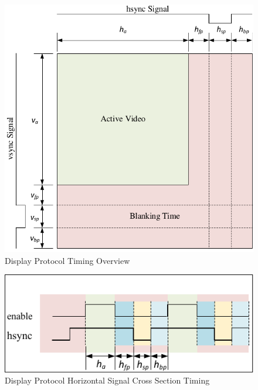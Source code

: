     \begin{figure}
        \centering
        \includegraphics[width=1.0\textwidth]{fig/display_timing_overview.pdf}
        \caption{Display Protocol Timing Overview}
        \label{fig:display_protocol_timing_overview}
    \end{figure}

    \begin{figure}
        \centering
        \includegraphics[width=1.0\textwidth]{fig/display_timing_line_cross.pdf}
        \caption{Display Protocol Horizontal Signal Cross Section Timing}
        \label{fig:display_protocol_line_cross}
    \end{figure}


